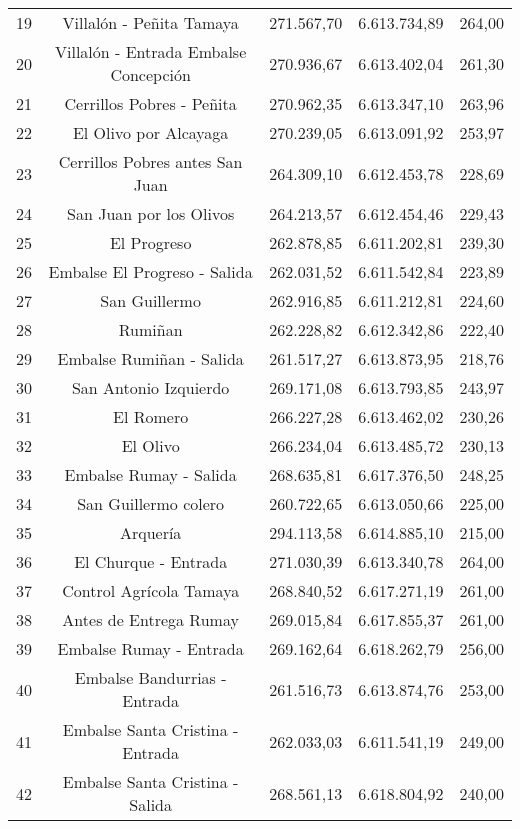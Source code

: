 \documentclass[]{article}
\begin{document}
\begin{longtable}[t]{ccccc}
19 & Villalón - Peñita Tamaya & 271.567,70 & 6.613.734,89 & 264,00\\
20 & Villalón - Entrada Embalse Concepción & 270.936,67 & 6.613.402,04 & 261,30\\
21 & Cerrillos Pobres - Peñita & 270.962,35 & 6.613.347,10 & 263,96\\
22 & El Olivo por Alcayaga & 270.239,05 & 6.613.091,92 & 253,97\\
23 & Cerrillos Pobres antes San Juan & 264.309,10 & 6.612.453,78 & 228,69\\
24 & San Juan por los Olivos & 264.213,57 & 6.612.454,46 & 229,43\\
25 & El Progreso & 262.878,85 & 6.611.202,81 & 239,30\\
26 & Embalse El Progreso - Salida & 262.031,52 & 6.611.542,84 & 223,89\\
27 & San Guillermo & 262.916,85 & 6.611.212,81 & 224,60\\
28 & Rumiñan & 262.228,82 & 6.612.342,86 & 222,40\\
29 & Embalse Rumiñan - Salida & 261.517,27 & 6.613.873,95 & 218,76\\
30 & San Antonio Izquierdo & 269.171,08 & 6.613.793,85 & 243,97\\
31 & El Romero & 266.227,28 & 6.613.462,02 & 230,26\\
32 & El Olivo & 266.234,04 & 6.613.485,72 & 230,13\\
33 & Embalse Rumay - Salida & 268.635,81 & 6.617.376,50 & 248,25\\
34 & San Guillermo colero & 260.722,65 & 6.613.050,66 & 225,00\\
35 & Arquería & 294.113,58 & 6.614.885,10 & 215,00\\
36 & El Churque - Entrada & 271.030,39 & 6.613.340,78 & 264,00\\
37 & Control Agrícola Tamaya & 268.840,52 & 6.617.271,19 & 261,00\\
38 & Antes de Entrega Rumay & 269.015,84 & 6.617.855,37 & 261,00\\
39 & Embalse Rumay - Entrada & 269.162,64 & 6.618.262,79 & 256,00\\
40 & Embalse Bandurrias - Entrada & 261.516,73 & 6.613.874,76 & 253,00\\
41 & Embalse Santa Cristina - Entrada & 262.033,03 & 6.611.541,19 & 249,00\\
42 & Embalse Santa Cristina - Salida & 268.561,13 & 6.618.804,92 & 240,00\\*
\end{longtable}
\end{document}
